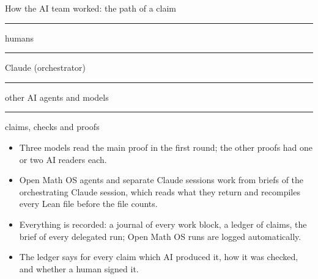 \documentclass[aspectratio=169,11pt]{beamer}
\begin{document}
\begin{frame}{How the AI team worked: the path of a claim}

  \vspace{1pt}
  {\scriptsize
  \textcolor{atomgreen}{\rule{7pt}{7pt}} humans \quad
  \textcolor{symblue}{\rule{7pt}{7pt}} Claude (orchestrator) \quad
  \textcolor{asymorange}{\rule{7pt}{7pt}} other AI agents and models \quad
  \textcolor{gray!45}{\rule{7pt}{7pt}} claims, checks and proofs \par}

  \vspace{3pt}
  \raggedright\scriptsize
  \begin{itemize}\setlength{\itemsep}{0pt}
    \item Three models read the main proof in the first round; the other proofs had one or two AI readers each.
    \item Open Math OS agents and separate Claude sessions work from briefs of the orchestrating Claude
      session, which reads what they return and recompiles every Lean file before the file counts.
    \item Everything is recorded: a journal of every work block, a ledger of claims, the brief of every
      delegated run; Open Math OS runs are logged automatically.
    \item The ledger says for every claim which AI produced it, how it was checked, and whether a human signed it.
  \end{itemize}
\end{frame}
\end{document}
